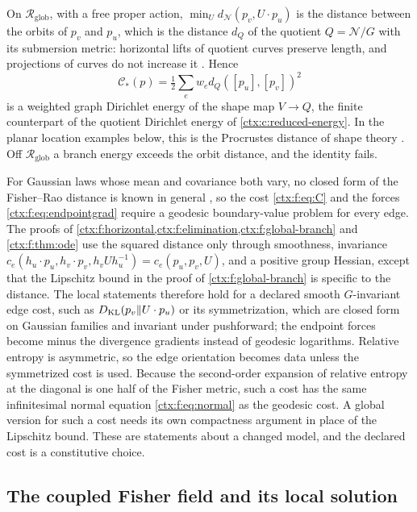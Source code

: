 On $\mathcal R_{\mathrm{glob}}$, with a free proper action, $\min_Ud_{\mathcal N}(p_v,U\cdot p_u)$ is the distance between the orbits of $p_v$ and $p_u$, which is the distance $d_Q$ of the quotient $Q=\mathcal N/G$ with its submersion metric: horizontal lifts of quotient curves preserve length, and projections of curves do not increase it \cite{ONeill1966}. Hence
\begin{equation}
 \mathcal C_*(p)=\tfrac12\sum_ew_ed_Q([p_u],[p_v])^2
 \label{ctx:f:eq:orbit-distance}
\end{equation}
is a weighted graph Dirichlet energy of the shape map $V\to Q$, the finite counterpart of the quotient Dirichlet energy of \cref{ctx:c:reduced-energy}. In the planar location examples below, this is the Procrustes distance of shape theory \cite{Kendall1984}. Off $\mathcal R_{\mathrm{glob}}$ a branch energy exceeds the orbit distance, and the identity fails.

For Gaussian laws whose mean and covariance both vary, no closed form of the Fisher--Rao distance is known in general \cite{PineleStrapassonCosta2020}, so the cost \cref{ctx:f:eq:C} and the forces \cref{ctx:f:eq:endpointgrad} require a geodesic boundary-value problem for every edge. The proofs of \cref{ctx:f:horizontal,ctx:f:elimination,ctx:f:global-branch} and \cref{ctx:f:thm:ode} use the squared distance only through smoothness, invariance $c_e(h_u\cdot p_u,h_v\cdot p_v,h_vUh_u^{-1})=c_e(p_u,p_v,U)$, and a positive group Hessian, except that the Lipschitz bound in the proof of \cref{ctx:f:global-branch} is specific to the distance. The local statements therefore hold for a declared smooth $G$-invariant edge cost, such as $D_{\mathrm{KL}}(p_v\Vert U\cdot p_u)$ or its symmetrization, which are closed form on Gaussian families and invariant under pushforward; the endpoint forces become minus the divergence gradients instead of geodesic logarithms. Relative entropy is asymmetric, so the edge orientation becomes data unless the symmetrized cost is used. Because the second-order expansion of relative entropy at the diagonal is one half of the Fisher metric, such a cost has the same infinitesimal normal equation \cref{ctx:f:eq:normal} as the geodesic cost. A global version for such a cost needs its own compactness argument in place of the Lipschitz bound. These are statements about a changed model, and the declared cost is a constitutive choice.

\subsection{The coupled Fisher field and its local solution}

